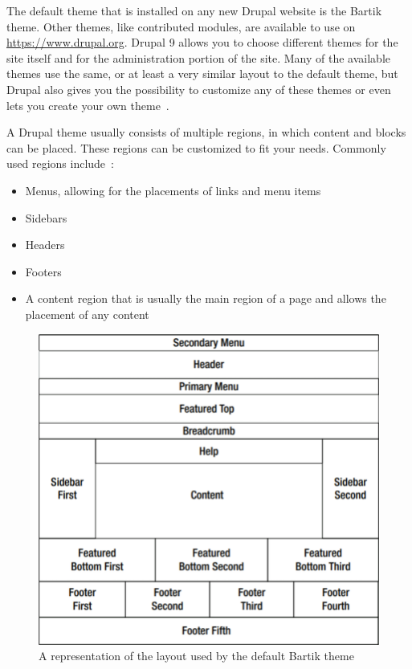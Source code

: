 The default theme that is installed on any new Drupal website is the Bartik theme. Other themes, like contributed modules, are available to use on \url{https://www.drupal.org}. Drupal 9 allows you to choose different themes for the site itself and for the administration portion of the site. Many of the available themes use the same, or at least a very similar layout to the default theme, but Drupal also gives you the possibility to customize any of these themes or even lets you create your own theme~\autocite{Tomlinson2015}.

A Drupal theme usually consists of multiple regions, in which content and blocks can be placed. These regions can be customized to fit your needs. Commonly used regions include~\autocite{Tomlinson2015}: 
\begin{itemize}
	\item  Menus, allowing for the placements of links and menu items
	\item  Sidebars
	\item  Headers
	\item  Footers
	\item  A content region that is usually the main region of a page and allows the placement of any content
\end{itemize}

\begin{figure}
	\centering
	\includegraphics{./img/Bartik_Theme.png}
	\caption[The Bartik theme]{A representation of the layout used by the default Bartik theme ~\autocite{Tomlinson2015}}
\end{figure}


